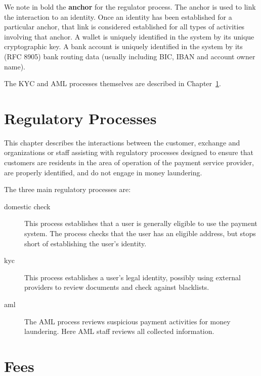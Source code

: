 \documentclass[10pt,a4paper,oneside]{book}
\begin{document}
We note in bold the {\bf anchor} for the regulator process. The anchor is used
to link the interaction to an identity.  Once an identity has been established
for a particular anchor, that link is considered established for all types of
activities involving that anchor.  A wallet is uniquely identified in the
system by its unique cryptographic key.  A bank account is uniquely identified
in the system by its (RFC 8905) bank routing data (usually including BIC, IBAN
and account owner name).

The KYC and AML processes themselves are described in
Chapter~\ref{chap:regproc}.







\chapter{Regulatory Processes} \label{chap:regproc}

This chapter describes the interactions between the customer, exchange and
organizations or staff assisting with regulatory processes designed to ensure
that customers are residents in the area of operation of the payment service
provider, are properly identified, and do not engage in money laundering.

The three main regulatory processes are:

\begin{description}
\item[domestic check] This process establishes that a user is generally
  eligible to use the payment system.  The process checks that the user has an
  eligible address, but stops short of establishing the user's identity.
\item[kyc] This process establishes a user's legal identity, possibly
  using external providers to review documents and check against blacklists.
\item[aml] The AML process reviews suspicious payment activities for
  money laundering. Here AML staff reviews all collected information.
\end{description}


%



\chapter{Fees} \label{chap:fees}
\end{document}
